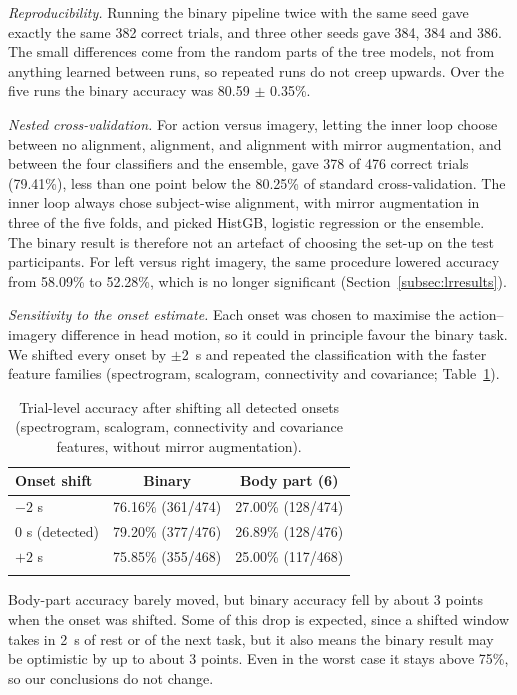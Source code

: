 \documentclass[pdflatex,sn-mathphys-num]{sn-jnl}%
\theoremstyle{thmstyleone}%
\theoremstyle{thmstyletwo}%
\theoremstyle{thmstylethree}%
\begin{document}
\emph{Reproducibility.} Running the binary pipeline twice with the same seed gave exactly the same 382 correct trials, and three other seeds gave 384, 384 and 386. The small differences come from the random parts of the tree models, not from anything learned between runs, so repeated runs do not creep upwards. Over the five runs the binary accuracy was 80.59 $\pm$ 0.35\%.

\emph{Nested cross-validation.} For action versus imagery, letting the inner loop choose between no alignment, alignment, and alignment with mirror augmentation, and between the four classifiers and the ensemble, gave 378 of 476 correct trials (79.41\%), less than one point below the 80.25\% of standard cross-validation. The inner loop always chose subject-wise alignment, with mirror augmentation in three of the five folds, and picked HistGB, logistic regression or the ensemble. The binary result is therefore not an artefact of choosing the set-up on the test participants. For left versus right imagery, the same procedure lowered accuracy from 58.09\% to 52.28\%, which is no longer significant (Section~\ref{subsec:lrresults}).

\emph{Sensitivity to the onset estimate.} Each onset was chosen to maximise the action--imagery difference in head motion, so it could in principle favour the binary task. We shifted every onset by $\pm$2~s and repeated the classification with the faster feature families (spectrogram, scalogram, connectivity and covariance; Table~\ref{tab:onsetsens}).

\begin{table}[htbp]
\centering
\caption{Trial-level accuracy after shifting all detected onsets (spectrogram, scalogram, connectivity and covariance features, without mirror augmentation).}
\label{tab:onsetsens}
\footnotesize
\begin{tabular}{@{}lcc@{}}
\toprule
Onset shift & Binary & Body part (6) \\
\midrule
$-2$ s & 76.16\% (361/474) & 27.00\% (128/474) \\
0 s (detected) & 79.20\% (377/476) & 26.89\% (128/476) \\
$+2$ s & 75.85\% (355/468) & 25.00\% (117/468) \\
\botrule
\end{tabular}
\end{table}

Body-part accuracy barely moved, but binary accuracy fell by about 3 points when the onset was shifted. Some of this drop is expected, since a shifted window takes in 2~s of rest or of the next task, but it also means the binary result may be optimistic by up to about 3 points. Even in the worst case it stays above 75\%, so our conclusions do not change.
\end{document}

